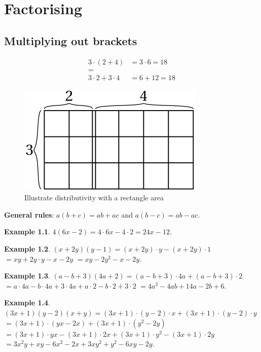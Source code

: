 \documentclass[
  12pt,
  oneside]{book}
\theoremstyle{definition}
\theoremstyle{definition}
\newtheorem{example}{Example}[chapter]
\theoremstyle{definition}
\theoremstyle{definition}
\theoremstyle{remark}
\begin{document}
\chapter{Factorising}\label{factorising}

\section{Multiplying out brackets}\label{multiplying-out-brackets}

\begin{align*}
3\cdot(2+4) &= 3\cdot 6 = 18\\
=\quad\quad\\
3\cdot2 + 3\cdot 4 &= 6+12 = 18
\end{align*}

\begin{figure}

{\centering \includegraphics{t02-distrib} 

}

\caption{Illustrate distributivity with a rectangle area}\label{fig:unnamed-chunk-12}
\end{figure}

\textbf{General rules}: \(a(b+c)=ab+ac\) and \(a(b-c) = ab-ac\).

\begin{example}
\(4(6x-2)=4\cdot 6x - 4\cdot 2 = 24x-12\).
\end{example}

\begin{example}
\((x+2y)(y-1)=(x+2y)\cdot y - (x+2y)\cdot 1\) \(= xy+2y\cdot y - x -2y\) \(= xy-2y^2-x-2y\).
\end{example}

\begin{example}
\((a-b+3)(4a+2)=(a-b+3)\cdot4a + (a-b+3)\cdot 2\) \(=a\cdot 4a - b\cdot 4a + 3\cdot 4a + a\cdot 2 - b\cdot 2 + 3\cdot 2\) \(= 4a^2 - 4ab + 14a - 2b+6\).
\end{example}

\begin{example}
\((3x+1)(y-2)(x+y)=(3x+1)\cdot(y-2)\cdot x + (3x+1)\cdot(y-2)\cdot y\) \(=(3x+1)\cdot(yx-2x) + (3x+1)\cdot(y^2-2y)\) \(= (3x+1)\cdot yx - (3x+1)\cdot 2x + (3x+1)\cdot y^2 - (3x+1)\cdot 2y\) \(= 3x^2y + xy - 6x^2 - 2x + 3xy^2 + y^2 - 6xy - 2y\).
\end{example}
\end{document}
